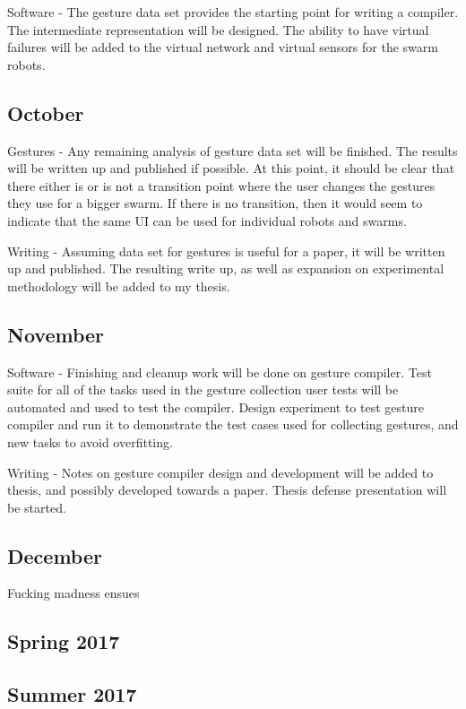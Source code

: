 \documentclass[]{article}
\begin{document}
Software - The gesture data set provides the starting point for writing a compiler. The intermediate representation will be designed. The ability to have virtual failures will be added to the virtual network and virtual sensors for the swarm robots. 

\subsection{October}

Gestures - Any remaining analysis of gesture data set will be finished. 
The results will be written up and published if possible. 
At this point, it should be clear that there either is or is not a transition point where the user changes the gestures they use for a bigger swarm. 
If there is no transition, then it would seem to indicate that the same UI can be used for individual robots and swarms. 

Writing - Assuming data set for gestures is useful for a paper, it will be written up and published. The resulting write up, as well as expansion on experimental methodology will be added to my thesis. 

\subsection{November}

Software - Finishing and cleanup work will be done on gesture compiler. Test suite for all of the tasks used in the gesture collection user tests will be automated and used to test the compiler. Design experiment to test gesture compiler and run it to demonstrate the test cases used for collecting gestures, and new tasks to avoid overfitting. 

Writing - Notes on gesture compiler design and development will be added to thesis, and possibly developed towards a paper. Thesis defense presentation will be started. 

\subsection{December}

Fucking madness ensues

\subsection{Spring 2017}

\subsection{Summer 2017}
\end{document}
